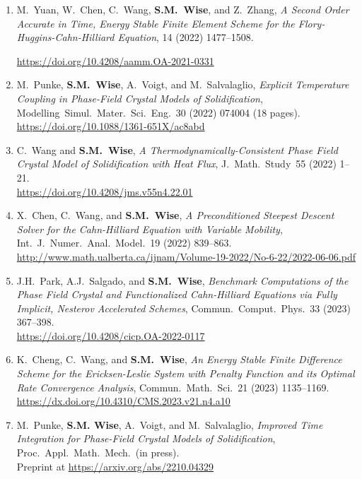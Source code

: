 \documentclass[11pt]{letter}
\begin{document}
\begin{enumerate}
	\item
M.~Yuan, W.~Chen, C.~Wang, \textbf{S.M.~Wise}, and Z.~Zhang, {\sl A Second Order Accurate in Time, Energy Stable Finite Element Scheme for the Flory-Huggins-Cahn-Hilliard Equation}, 14 (2022) 1477--1508.

\url{https://doi.org/10.4208/aamm.OA-2021-0331}

	\item
M.~Punke, \textbf{S.M.~Wise}, A.~Voigt, and M.~Salvalaglio, {\sl  Explicit Temperature Coupling in Phase-Field Crystal Models of Solidification}, Modelling~Simul.~Mater.~Sci.~Eng.~30 (2022) 074004 (18 pages).
	\\ 
\url{https://doi.org/10.1088/1361-651X/ac8abd}

	\item
C.~Wang  and \textbf{S.M.~Wise}, {\sl A Thermodynamically-Consistent Phase Field Crystal Model of Solidification with Heat Flux}, J.~Math.~Study~55 (2022) 1--21.
	\\
\url{https://doi.org/10.4208/jms.v55n4.22.01}

	\item
X.~Chen, C.~Wang, and \textbf{S.M.~Wise}, {\sl A Preconditioned Steepest Descent Solver for the Cahn-Hilliard Equation with Variable Mobility}, Int.~J.~Numer.~Anal.~Model.~19 (2022) 839--863.
	\\
\url{http://www.math.ualberta.ca/ijnam/Volume-19-2022/No-6-22/2022-06-06.pdf}

	\item
J.H.~Park, A.J.~Salgado, and \textbf{S.M.~Wise}, {\sl Benchmark Computations of the Phase Field Crystal and Functionalized Cahn-Hilliard Equations via Fully Implicit, Nesterov Accelerated Schemes}, Commun.~Comput.~Phys.~33 (2023) 367--398.
	\\
\url{https://doi.org/10.4208/cicp.OA-2022-0117}

	\item
K.~Cheng, C.~Wang, and \textbf{S.M.~Wise}, {\sl An Energy Stable Finite Difference Scheme for the Ericksen-Leslie System with Penalty Function and its Optimal Rate Convergence Analysis}, Commun.~Math.~Sci.~21 (2023)  1135--1169.
	\\
\url{https://dx.doi.org/10.4310/CMS.2023.v21.n4.a10}

	\item
M.~Punke, \textbf{S.M. Wise}, A.~Voigt, and M.~Salvalaglio, {\sl Improved Time Integration for Phase-Field Crystal Models of Solidification}, Proc.~Appl.~Math.~Mech.~(in press).
	\\
Preprint at \url{https://arxiv.org/abs/2210.04329}


\end{enumerate}
\end{document}
